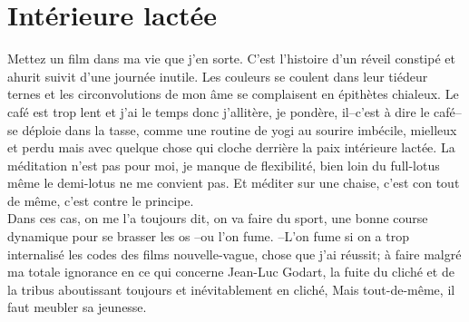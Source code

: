 

\section*{Intérieure lactée}
Mettez un film dans ma vie que j'en sorte.
C'est l'histoire d'un réveil constipé et ahurit suivit d'une journée inutile.
Les couleurs se coulent dans leur tiédeur ternes et les circonvolutions de mon
âme se complaisent en épithètes chialeux. Le café est trop lent et j'ai le temps
donc j'allitère, je pondère, il--c'est à dire le café--se déploie dans la tasse,
comme une routine de yogi au sourire imbécile, mielleux et perdu mais avec quelque
chose qui cloche derrière la paix intérieure lactée. La  méditation n'est pas
pour moi, je manque de flexibilité, bien loin du full-lotus même le demi-lotus
ne me convient pas. Et méditer sur une chaise, c'est con tout de même, c'est
contre le principe.\\

Dans ces cas, on me l'a toujours dit, on va faire du sport, une bonne course
dynamique pour se brasser les os --ou l'on fume. --L'on fume si on a trop
internalisé les codes des films nouvelle-vague, chose que j'ai réussit; à faire
malgré ma totale ignorance en ce qui concerne Jean-Luc Godart, la fuite du
cliché et de la tribus aboutissant toujours et inévitablement en cliché, Mais
tout-de-même, il faut meubler sa jeunesse.\\

